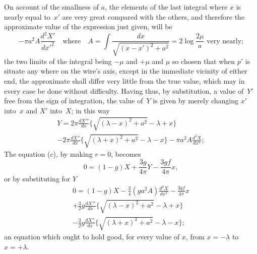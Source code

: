 \documentclass[12pt,notitlepage]{amsart}
\begin{document}
On account of the smallness of $a$, the elements of the last integral
where $x$ is nearly equal to~$x'$ are very great compared with the others, and
therefore the approximate value of the expression just given, will be
\[
-\pi a^2A\frac{d^2X'}{dx'^2}
\quad\text{where}\quad
A=\int\frac{dx}{\sqrt{(x-x')^2+a^2}}=2\log\frac{2\mu}{a}
\text{\ very nearly;}
\]
the two limits of the integral being $-\mu$ and $+\mu$ and $\mu$ so chosen that
when $p'$ is situate any where on the wire's axis, except in the immediate
vicinity of either end, the approximate shall differ very little from the true
value, which may in every case be done without difficulty. Having thus, by
substitution, a value of~$Y'$ free from the sign of integration,
the value of~$Y$
is given by merely changing $x'$ into~$x$ and $X'$ into~$X$; in this way
\begin{multline*}
Y=
2\pi\frac{dX'''}{dx}
\biggl\{\sqrt{(\lambda-x)^2+a^2}-\lambda+x\biggr\}\\
-2\pi\frac{dX''}{dx}
\biggl\{\sqrt{(\lambda+x)^2+a^2}-\lambda-x\biggr\}
-\pi a^2A\frac{d^2X}{dx^2};
\end{multline*}
The equation ($c$), by making $r=0$, becomes
\[
0=(1-g)X+\frac{3g}{4\pi}Y-\frac{3gf}{4\pi}x,
\]
or by substituting for $Y$
\begin{multline*}
0=(1-g)X-\tfrac34(ga^2A)\frac{d^2X}{dx^2}-\frac{3gf}{4\pi}x\\
+\tfrac32g\frac{dX'''}{dx}
\biggl\{\sqrt{(\lambda-x)^2+a^2}-\lambda+x\biggr\}\\
-\tfrac32g\frac{dX''}{dx}
\biggl\{\sqrt{(\lambda+x)^2+a^2}-\lambda-x\biggr\};
\end{multline*}
an equation which ought to hold good, for every value of $x$, from 
$x=-\lambda$ to $x=+\lambda$.
\end{document}
